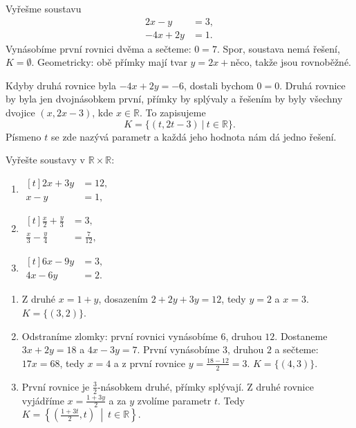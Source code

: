 \begin{example}
  Vyřešme soustavu
  \begin{align*}
    2x - y &= 3,\\
    -4x + 2y &= 1.
  \end{align*}
  Vynásobíme první rovnici dvěma a sečteme: $0 = 7$. Spor, soustava nemá řešení, $K = \emptyset$. Geometricky: obě přímky mají tvar $y = 2x + \text{něco}$, takže jsou rovnoběžné.

  Kdyby druhá rovnice byla $-4x + 2y = -6$, dostali bychom $0 = 0$. Druhá rovnice by byla jen dvojnásobkem první, přímky by splývaly a řešením by byly všechny dvojice $(x, 2x - 3)$, kde $x\in\mathbb{R}$. To zapisujeme
  \begin{equation*}
    K = \{(t, 2t - 3)\ |\ t\in\mathbb{R}\}.
  \end{equation*}
  Písmeno $t$ se zde nazývá parametr a každá jeho hodnota nám dá jedno řešení.
\end{example}

\begin{problem}
  Vyřešte soustavy v $\mathbb{R}\times\mathbb{R}$:
  \begin{enumerate}[label=(\alph*)]
    \item $\begin{aligned}[t] 2x + 3y &= 12,\\ x - y &= 1,\end{aligned}$
    \item $\begin{aligned}[t] \tfrac{x}{2} + \tfrac{y}{3} &= 3,\\ \tfrac{x}{3} - \tfrac{y}{4} &= \tfrac{7}{12},\end{aligned}$
    \item $\begin{aligned}[t] 6x - 9y &= 3,\\ 4x - 6y &= 2.\end{aligned}$
  \end{enumerate}
\end{problem}

\begin{solution}
  \begin{enumerate}[label=(\alph*)]
    \item Z druhé $x = 1 + y$, dosazením $2 + 2y + 3y = 12$, tedy $y = 2$ a $x = 3$. $K = \{(3, 2)\}$.
    \item Odstraníme zlomky: první rovnici vynásobíme $6$, druhou $12$. Dostaneme $3x + 2y = 18$ a $4x - 3y = 7$. První vynásobíme $3$, druhou $2$ a sečteme: $17x = 68$, tedy $x = 4$ a z první rovnice $y = \frac{18 - 12}{2} = 3$. $K = \{(4, 3)\}$.
    \item První rovnice je $\frac{3}{2}$-násobkem druhé, přímky splývají. Z druhé rovnice vyjádříme $x = \frac{1 + 3y}{2}$ a za $y$ zvolíme parametr $t$. Tedy $K = \left\{\left(\frac{1 + 3t}{2}, t\right)\ \middle|\ t\in\mathbb{R}\right\}$.
  \end{enumerate}
\end{solution}

